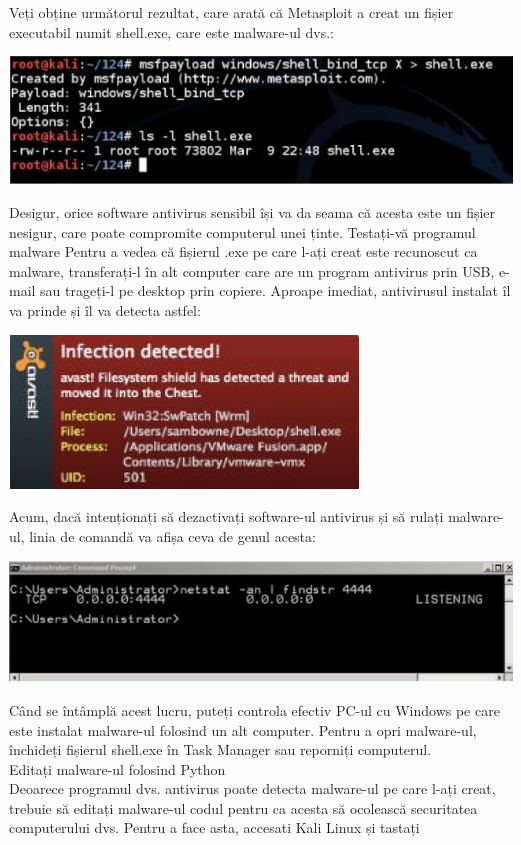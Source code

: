 \documentclass[oneside,20pt]{article}          %
\begin{document}
Veți obține următorul rezultat, care arată că Metasploit a creat un fișier executabil
numit shell.exe, care este malware-ul dvs.:
\begin{center}
\includegraphics[height=2 cm]{9.png}
\end{center}
Desigur, orice software antivirus sensibil își va da seama că acesta este un fișier nesigur, care poate
compromite computerul unei ținte.
Testați-vă programul malware
Pentru a vedea că fișierul .exe pe care l-ați creat este recunoscut ca malware, transferați-l în alt
computer care are un program antivirus prin USB, e-mail sau trageți-l pe desktop prin copiere.
Aproape imediat, antivirusul instalat îl va prinde și îl va detecta astfel:
\begin{center}
\includegraphics[height=4 cm]{10.png}
\end{center}
Acum, dacă intenționați să dezactivați software-ul antivirus și să rulați malware-ul, linia de comandă
va afișa ceva de genul acesta:
\begin{center}
\includegraphics[height=2 cm]{11.png}
\end{center}
Când se întâmplă acest lucru, puteți controla efectiv PC-ul cu Windows pe care este instalat malware-ul
folosind un alt computer.
Pentru a opri malware-ul, închideți fișierul shell.exe în Task Manager sau reporniți computerul.\\
Editați malware-ul folosind Python\\
Deoarece programul dvs. antivirus poate detecta malware-ul pe care l-ați creat, trebuie să editați malware-ul
codul pentru ca acesta să ocolească securitatea computerului dvs. Pentru a face asta, accesati Kali Linux și tastați
\end{document}
